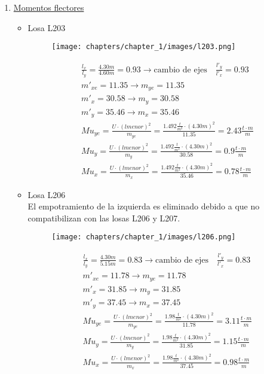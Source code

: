 \begin{enumerate}
\begin{itemize}
\end{itemize}


\item \underline{Momentos flectores}\\

\begin{itemize}
\item Losa L203

\begin{figure}[H]
\begin{center}
     \texttt{[image: chapters/chapter\_1/images/l203.png]}
\end{center}
\end{figure}


\begin{align*}
& \frac{l_x}{l_y} = \frac{4.30m}{4.60m} = 0.93 \rightarrow \text{cambio de ejes} \quad \frac{l'_y}{l'_x} = 0.93\\
& m'_{xe} = 11.35 \rightarrow m_{ye} = 11.35 \\
& m'_x = 30.58 \rightarrow m_y = 30.58 \\
& m'_y= 35.46 \rightarrow m_x = 35.46 \\
& Mu_{ye} = \frac{U \cdot (lmenor)^2}{m_{ye}} = \frac{1.492 \frac{t}{m^2} \cdot (4.30m)^2}{11.35} = 2.43 \frac{t \cdot m}{m} \\
& Mu_y = \frac{U \cdot (lmenor)^2}{m_y} = \frac{1.492 \frac{t}{m^2} \cdot (4.30m)^2}{30.58} = 0.9 \frac{t \cdot m}{m} \\
& Mu_x = \frac{U \cdot (lmenor)^2}{m_x} = \frac{1.492 \frac{t}{m^2} \cdot (4.30m)^2}{35.46} = 0.78 \frac{t \cdot m}{m}
\end{align*}

\newpage
\item Losa L206 \\
El empotramiento de la izquierda es eliminado debido a que no compatibilizan con las losas L206 y L207.

\begin{figure}[H]
\begin{center}
     \texttt{[image: chapters/chapter\_1/images/l206.png]}
\end{center}
\end{figure}

\begin{align*}
& \frac{l_x}{l_y} = \frac{4.30m}{5.15m} = 0.83 \rightarrow \text{cambio de ejes} \quad \frac{l'_y}{l'_x} = 0.83\\
& m'_{xe} = 11.78 \rightarrow m_{ye} = 11.78 \\
& m'_x = 31.85 \rightarrow m_y = 31.85 \\
& m'_y= 37.45 \rightarrow m_x = 37.45 \\
& Mu_{ye} = \frac{U \cdot (lmenor)^2}{m_{ye}} = \frac{1.98 \frac{t}{m^2} \cdot (4.30m)^2}{11.78} = 3.11 \frac{t \cdot m}{m} \\
& Mu_y = \frac{U \cdot (lmenor)^2}{m_y} = \frac{1.98 \frac{t}{m^2} \cdot (4.30m)^2}{31.85} = 1.15 \frac{t \cdot m}{m} \\
& Mu_x = \frac{U \cdot (lmenor)^2}{m_x} = \frac{1.98 \frac{t}{m^2} \cdot (4.30m)^2}{37.45} = 0.98 \frac{t \cdot m}{m}
\end{align*}


\end{itemize}
\end{enumerate}
